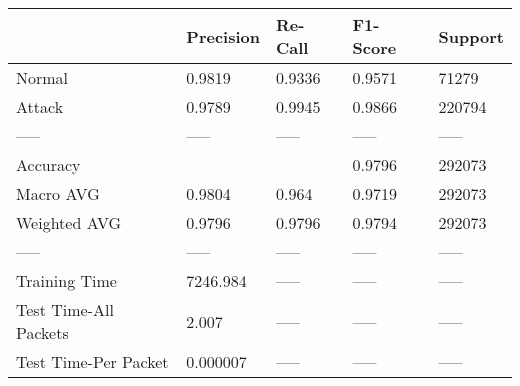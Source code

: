 \begin{tabular}{lllll}
\toprule
{} & Precision & Re-Call & F1-Score & Support \\
\midrule
Normal                &    0.9819 &  0.9336 &   0.9571 &   71279 \\
Attack                &    0.9789 &  0.9945 &   0.9866 &  220794 \\
-----                 &     ----- &   ----- &    ----- &   ----- \\
Accuracy              &           &         &   0.9796 &  292073 \\
Macro AVG             &    0.9804 &   0.964 &   0.9719 &  292073 \\
Weighted AVG          &    0.9796 &  0.9796 &   0.9794 &  292073 \\
-----                 &     ----- &   ----- &    ----- &   ----- \\
Training Time         &  7246.984 &   ----- &    ----- &   ----- \\
Test Time-All Packets &     2.007 &   ----- &    ----- &   ----- \\
Test Time-Per Packet  &  0.000007 &   ----- &    ----- &   ----- \\
\bottomrule
\end{tabular}
